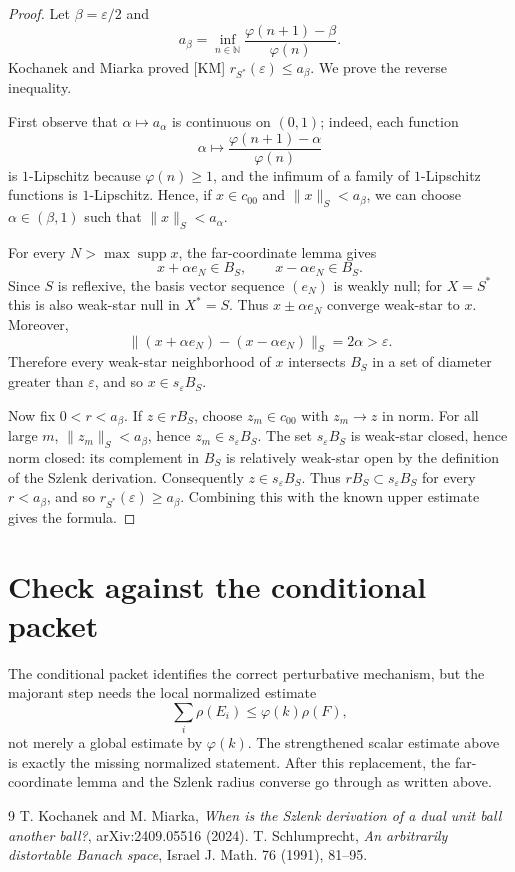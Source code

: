 \documentclass[11pt]{article}
\newcommand{\N}{\mathbb N}
\newcommand{\eps}{\varepsilon}
\newcommand{\ph}{\varphi}
\DeclareMathOperator{\supp}{supp}
\begin{document}
\begin{proof}
Let $\beta=\eps/2$ and
\[
 a_\beta=\inf_{n\in\N}\frac{\ph(n+1)-\beta}{\ph(n)}.
\]
Kochanek and Miarka proved [KM] $r_{S^*}(\eps)\le a_\beta$.  We prove the reverse inequality.

First observe that $\alpha\mapsto a_\alpha$ is continuous on $(0,1)$; indeed, each function
\[
 \alpha\mapsto \frac{\ph(n+1)-\alpha}{\ph(n)}
\]
is $1$-Lipschitz because $\ph(n)\ge 1$, and the infimum of a family of $1$-Lipschitz functions
is $1$-Lipschitz.  Hence, if $x\in c_{00}$ and $\|x\|_S<a_\beta$, we can choose
$\alpha\in(\beta,1)$ such that $\|x\|_S<a_\alpha$.

For every $N>\max\supp x$, the far-coordinate lemma gives
\[
 x+\alpha e_N\in B_S,
 \qquad
 x-\alpha e_N\in B_S.
\]
Since $S$ is reflexive, the basis vector sequence $(e_N)$ is weakly null; for $X=S^*$ this is also
weak-star null in $X^*=S$.  Thus $x\pm\alpha e_N$ converge weak-star to $x$.  Moreover,
\[
 \|(x+\alpha e_N)-(x-\alpha e_N)\|_S=2\alpha>\eps.
\]
Therefore every weak-star neighborhood of $x$ intersects $B_S$ in a set of diameter greater than
$\eps$, and so $x\in s_\eps B_S$.

Now fix $0<r<a_\beta$.  If $z\in rB_S$, choose $z_m\in c_{00}$ with $z_m\to z$ in norm.
For all large $m$, $\|z_m\|_S<a_\beta$, hence $z_m\in s_\eps B_S$.  The set $s_\eps B_S$ is
weak-star closed, hence norm closed: its complement in $B_S$ is relatively weak-star open by the
definition of the Szlenk derivation.  Consequently $z\in s_\eps B_S$.  Thus
$rB_S\subset s_\eps B_S$ for every $r<a_\beta$, and so $r_{S^*}(\eps)\ge a_\beta$.
Combining this with the known upper estimate gives the formula.
\end{proof}

\section{Check against the conditional packet}

The conditional packet identifies the correct perturbative mechanism, but the majorant step needs
the local normalized estimate
\[
 \sum_i\rho(E_i)\le \ph(k)\rho(F),
\]
not merely a global estimate by $\ph(k)$.  The strengthened scalar estimate above is exactly the
missing normalized statement.  After this replacement, the far-coordinate lemma and the Szlenk
radius converse go through as written above.

\begin{thebibliography}{9}
 T. Kochanek and M. Miarka, \emph{When is the Szlenk derivation of a dual unit ball another ball?}, arXiv:2409.05516 (2024).
 T. Schlumprecht, \emph{An arbitrarily distortable Banach space}, Israel J. Math. 76 (1991), 81--95.
\end{thebibliography}
\end{document}
